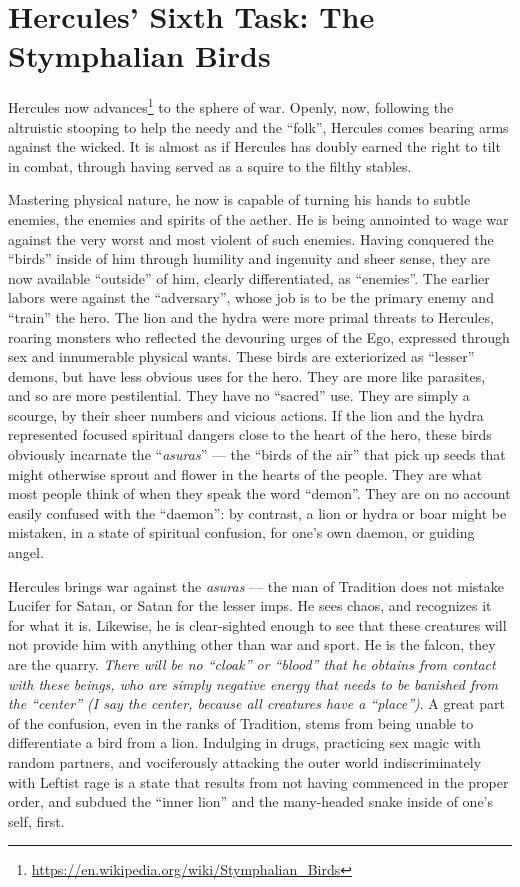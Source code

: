 \section{Hercules’ Sixth Task: The Stymphalian Birds}

Hercules now advances\footnote{\url{https://en.wikipedia.org/wiki/Stymphalian\_Birds}} to the sphere of war. Openly, now, following the altruistic stooping to help the needy and the ``folk'', Hercules comes bearing arms against the wicked. It is almost as if Hercules has doubly earned the right to tilt in combat, through having served as a squire to the filthy stables.

Mastering physical nature, he now is capable of turning his hands to subtle enemies, the enemies and spirits of the aether. He is being annointed to wage war against the very worst and most violent of such enemies. Having conquered the ``birds'' inside of him through humility and ingenuity and sheer sense, they are now available ``outside'' of him, clearly differentiated, as ``enemies''. The earlier labors were against the ``adversary'', whose job is to be the primary enemy and ``train'' the hero. The lion and the hydra were more primal threats to Hercules, roaring monsters who reflected the devouring urges of the Ego, expressed through sex and innumerable physical wants. These birds are exteriorized as ``lesser'' demons, but have less obvious uses for the hero. They are more like parasites, and so are more pestilential. They have no ``sacred'' use. They are simply a scourge, by their sheer numbers and vicious actions. If the lion and the hydra represented focused spiritual dangers close to the heart of the hero, these birds obviously incarnate the ``\emph{asuras}'' --- the ``birds of the air'' that pick up seeds that might otherwise sprout and flower in the hearts of the people. They are what most people think of when they speak the word ``demon''. They are on no account easily confused with the ``daemon'': by contrast, a lion or hydra or boar might be mistaken, in a state of spiritual confusion, for one's own daemon, or guiding angel.

Hercules brings war against the \emph{asuras} --- the man of Tradition does not mistake Lucifer for Satan, or Satan for the lesser imps. He sees chaos, and recognizes it for what it is. Likewise, he is clear-sighted enough to see that these creatures will not provide him with anything other than war and sport. He is the falcon, they are the quarry. \emph{There will be no ``cloak'' or ``blood'' that he obtains from contact with these beings, who are simply negative energy that needs to be banished from the ``center'' (I say the center, because all creatures have a ``place'')}. A great part of the confusion, even in the ranks of Tradition, stems from being unable to differentiate a bird from a lion. Indulging in drugs, practicing sex magic with random partners, and vociferously attacking the outer world indiscriminately with Leftist rage is a state that results from not having commenced in the proper order, and subdued the ``inner lion'' and the many-headed snake inside of one's self, first.


